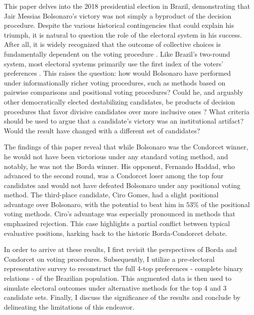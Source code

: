 \documentclass[hidelinks,11pt]{article} \usepackage[utf8]{inputenc}
\begin{document}
This paper delves into the 2018 presidential election in Brazil, demonstrating that Jair Messias Bolsonaro's victory was not simply a byproduct of the decision procedure. Despite the various historical contingencies that could explain his triumph, it is natural to question the role of the electoral system in his success. After all, it is widely recognized that the outcome of collective choices is fundamentally dependent on the voting procedure \parencite{riker1982liberalism}. Like Brazil's two-round system, most electoral systems primarily use the first index of the voters' preferences \parencite{grofman04_if_you_like_alter_vote}. This raises the question: how would Bolsonaro have performed under informationally richer voting procedures, such as methods based on pairwise comparisons and positional voting procedures? Could he, and arguably other democratically elected destabilizing candidates, be products of decision procedures that favor divisive candidates over more inclusive ones \parencite{igersheim22_compar_votin_method}? What criteria should be used to argue that a candidate's victory was an institutional artifact? Would the result have changed with a different set of candidates?

The findings of this paper reveal that while Bolsonaro was the Condorcet winner, he would not have been victorious under any standard voting method, and notably, he was not the Borda winner. His opponent, Fernando Haddad, who advanced to the second round, was a Condorcet loser among the top four candidates and would not have defeated Bolsonaro under any positional voting method. The third-place candidate, Ciro Gomes, had a slight positional advantage over Bolsonaro, with the potential to beat him in \(53\%\) of the positional voting methods. Ciro's advantage was especially pronounced in methods that emphasized rejection. This case highlights a partial conflict between typical evaluative positions, harking back to the historic Borda-Condorcet debate.

In order to arrive at these results, I first revisit the perspectives of Borda and Condorcet on voting procedures. Subsequently, I utilize a pre-electoral representative survey to reconstruct the full 4-top preferences - complete binary relations -  of the Brazilian population. This augmented data is then used to simulate electoral outcomes under alternative methods for the top 4 and 3 candidate sets. Finally, I discuss the significance of the results and conclude by delineating the limitations of this endeavor.
\end{document}
